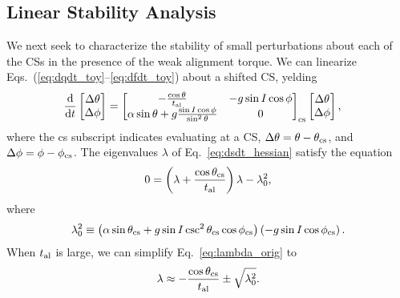 \documentclass[
        fleqn,
        usenatbib,
        referee
    ]{mnras}
\newcommand*{\rd}[2]{\frac{\mathrm{d}#1}{\mathrm{d}#2}}
\newcommand*{\p}[1]{\left(#1\right)}
\begin{document}
\subsection{Linear Stability Analysis}\label{ss:linear_stab}

We next seek to characterize the stability of small perturbations about each of
the CSs in the presence of the weak alignment torque. We can linearize
Eqs.~(\ref{eq:dqdt_toy}--\ref{eq:dfdt_toy}) about a shifted CS, yelding
\begin{align}
    \rd{}{t}\begin{bmatrix}
        \Delta \theta\\ \Delta \phi
    \end{bmatrix} &= \begin{bmatrix}
        -\frac{\cos \theta}{t_{\rm al}} &
        -g\sin I \cos \phi \\
        \alpha \sin \theta + g\frac{\sin I \cos \phi}{\sin^2\theta} &
        0
    \end{bmatrix}_{\rm cs}\begin{bmatrix}
        \Delta \theta \\ \Delta \phi
    \end{bmatrix},\label{eq:dsdt_hessian}
\end{align}
where the cs subscript indicates evaluating at a CS, $\Delta \theta = \theta -
\theta_{\rm cs}$, and $\Delta \phi = \phi - \phi_{\rm cs}$. The eigenvalues
$\lambda$ of Eq.~\eqref{eq:dsdt_hessian} satisfy the equation
\begin{equation}
    0 = \p{\lambda + \frac{\cos \theta_{\rm cs}}{t_{\rm al}}}\lambda
        - \lambda_0^2,\label{eq:lambda_orig}
\end{equation}
where
\begin{equation}
    \lambda_0^2 \equiv \p{\alpha
        \sin \theta_{\rm cs} + g\sin I \csc^2\theta_{\rm cs}\cos \phi_{\rm cs}}
            \p{- g \sin I \cos \phi_{\rm cs}}\label{eq:def_l0_sq}.
\end{equation}
When $t_{\rm al}$ is large, we can simplify Eq.~\eqref{eq:lambda_orig} to
\begin{equation}
    \lambda \approx -\frac{\cos \theta_{\rm cs}}{t_{\rm al}}
        \pm \sqrt{\lambda_0^2}. \label{eq:lambda_approx}
\end{equation}
\end{document}
